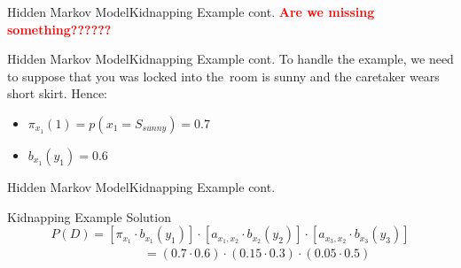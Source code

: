 \documentclass[10pt]{beamer}
\begin{document}
\begin{frame}{Hidden Markov Model}{Kidnapping Example cont.}
    \textbf{\textcolor{red}{Are we missing something??????}}
\end{frame}

\begin{frame}{Hidden Markov Model}{Kidnapping Example cont.}
    To handle the example, we need to suppose that you was locked into the\
    room is sunny and the caretaker wears short skirt. Hence:
  \begin{itemize}
      \item $\pi_{x_1}(1) = p(x_1 = S_{sunny}) = 0.7$\\
      \item $b_{x_1}(y_1) =  0.6$
  \end{itemize}
\end{frame}

\begin{frame}{Hidden Markov Model}{Kidnapping Example cont.}
   \begin{block}{Kidnapping Example Solution}
      \begin{equation}
         P(D) = [\pi_{x_1} \cdot b_{x_1}(y_1)] \cdot [a_{x_1,x_2} \cdot b_{x_2}(y_2)] \cdot [a_{x_3,x_2} \cdot b_{x_3}(y_3)]
      \end{equation}
  \ \ \ \ \ \ \ \ \ \ \ \ \ \ \ \ \ \ \ \ \ \ $= (0.7 \cdot 0.6) \cdot (0.15 \cdot 0.3) \cdot (0.05 \cdot 0.5)$
   \end{block}
\end{frame}

{\1
\begin{frame}
\end{frame}}
\end{document}
